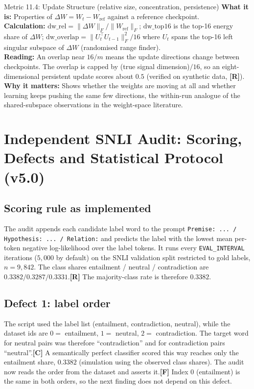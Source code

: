 \documentclass[11pt,a4paper]{article}
\newcommand{\sR}{\textbf{[R]}}
\newcommand{\sC}{\textbf{[C]}}
\newcommand{\sF}{\textbf{[F]}}
\begin{document}
\begin{metricbox}{Metric 11.4: Update Structure (relative size, concentration, persistence)}
\textbf{What it is:} Properties of $\Delta W = W_t - W_{\text{ref}}$ against a reference checkpoint.\\
\textbf{Calculation:} $\text{dw\_rel} = \|\Delta W\|_F/\|W_{\text{ref}}\|_F$; $\text{dw\_top16}$ is the top-16 energy share of $\Delta W$; $\text{dw\_overlap} = \|U_t^\top U_{t-1}\|_F^2/16$ where $U_t$ spans the top-16 left singular subspace of $\Delta W$ (randomised range finder).\\
\textbf{Reading:} An overlap near $16/m$ means the update directions change between checkpoints. The overlap is capped by (true signal dimension)$/16$, so an eight-dimensional persistent update scores about $0.5$ (verified on synthetic data, \sR{}).\\
\textbf{Why it matters:} Shows whether the weights are moving at all and whether learning keeps pushing the same few directions, the within-run analogue of the shared-subspace observations in the weight-space literature.
\end{metricbox}

\section{Independent SNLI Audit: Scoring, Defects and Statistical Protocol (v5.0)}\label{sec:snli}

\subsection{Scoring rule as implemented}
The audit appends each candidate label word to the prompt \texttt{Premise: ... / Hypothesis: ... / Relation:} and predicts the label with the lowest mean per-token negative log-likelihood over the label tokens. It runs every \texttt{EVAL\_INTERVAL} iterations ($5{,}000$ by default) on the SNLI validation split restricted to gold labels, $n = 9{,}842$. The class shares entailment / neutral / contradiction are $0.3382 / 0.3287 / 0.3331$.\sR{} The majority-class rate is therefore $0.3382$.

\subsection{Defect 1: label order}
The script used the label list (entailment, contradiction, neutral), while the dataset ids are $0 =$ entailment, $1 =$ neutral, $2 =$ contradiction. The target word for neutral pairs was therefore ``contradiction'' and for contradiction pairs ``neutral''.\sC{} A semantically perfect classifier scored this way reaches only the entailment share, $0.3382$ (simulation using the observed class shares). The audit now reads the order from the dataset and asserts it.\sF{} Index $0$ (entailment) is the same in both orders, so the next finding does not depend on this defect.
\end{document}
